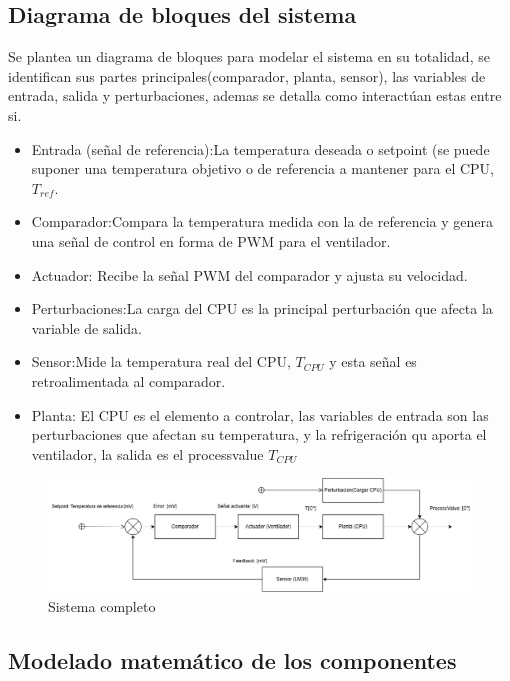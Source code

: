 \documentclass[12pt]{article}
\begin{document}
	 \subsection{Diagrama de bloques del sistema}
	 Se plantea un diagrama de bloques para modelar el sistema en su totalidad, se identifican sus partes principales(comparador, planta, sensor), las variables de entrada, salida y perturbaciones, ademas se detalla como interactúan estas entre si.
	 \begin{itemize}
	 	\item Entrada (señal de referencia):La temperatura deseada o setpoint (se puede suponer una temperatura objetivo o de referencia a mantener para el CPU, $T_{ref}$.
	 	
	 	\item Comparador:Compara la temperatura medida con la de referencia y genera una señal de control en forma de PWM para el ventilador.
	 	
	 	\item Actuador: Recibe la señal PWM del comparador y ajusta su velocidad.
	 	
	 	\item Perturbaciones:La carga del CPU es la principal perturbación que afecta la variable de salida.
	 	
	 	\item Sensor:Mide la temperatura real del CPU, $T_{CPU}$ y esta señal es retroalimentada al comparador.
	 	
	 	\item Planta: El CPU es el elemento a controlar, las variables de entrada son las perturbaciones que afectan su temperatura, y la refrigeración qu aporta el ventilador, la salida es el processvalue $T_{CPU}$
	 \end{itemize}
	 
	\begin{figure}[h!]
		\includegraphics[width=1\linewidth]{Imagenes/Sistema_comleto}
		\caption[Sistema completo]{Sistema completo}
		\label{fig:sistemacomleto}
	\end{figure}
	
	\subsection{Modelado matemático de los componentes}
	
\end{document}
